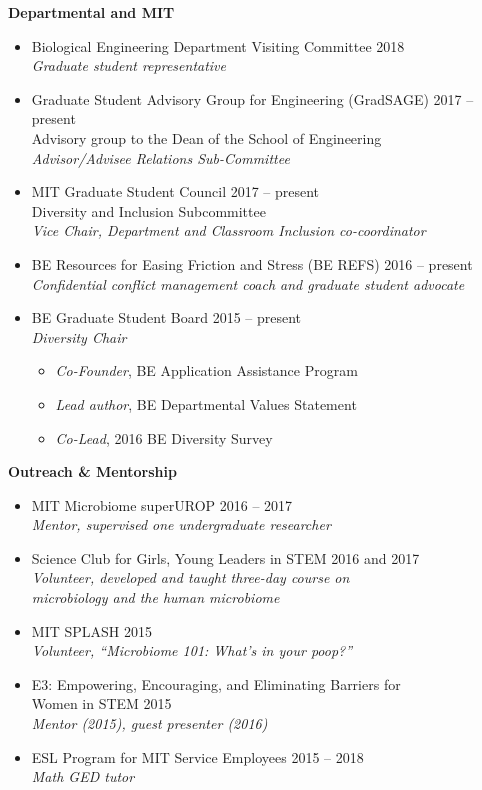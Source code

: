 \documentclass[10pt]{article}
\newenvironment{outerlist}[1][\enskip\textbullet]%
        {\begin{itemize}[#1,leftmargin=*]}{\end{itemize}%
         \vspace{-.6\baselineskip}}
\newenvironment{innerlist}[1][\enskip\textbullet]%
        {\begin{itemize}[#1,leftmargin=*,parsep=0pt,itemsep=0pt,topsep=0pt,partopsep=0pt]}
        {\end{itemize}}
\begin{document}
\textbf{Departmental and MIT}
\begin{outerlist}
	\item[] Biological Engineering Department Visiting Committee \hfill {2018} \\
	\textit{Graduate student representative}
	\item[] Graduate Student Advisory Group for Engineering (GradSAGE) \hfill {2017 -- present} \\
	Advisory group to the Dean of the School of Engineering \\
	\textit{Advisor/Advisee Relations Sub-Committee}
	\item[] MIT Graduate Student Council \hfill {2017 -- present} \\
		Diversity and Inclusion Subcommittee  \\
		\textit{Vice Chair, Department and Classroom Inclusion co-coordinator} 
	\item[] BE Resources for Easing Friction and Stress (BE REFS) \hfill {2016 -- present} \\
	\textit{Confidential conflict management coach and graduate student advocate}
	\item[] BE Graduate Student Board \hfill {2015 -- present} \\ 
		\textit{Diversity Chair} 
		\begin{innerlist}
			\item[] \textit{Co-Founder}, BE Application Assistance Program 
			\item[] \textit{Lead author}, BE Departmental Values Statement 
			\item[] \textit{Co-Lead}, 2016 BE Diversity Survey
		\end{innerlist}
\end{outerlist}
\vspace{.15in}

\textbf{Outreach \& Mentorship}
\begin{outerlist}
	\item[] MIT Microbiome superUROP \hfill {2016 -- 2017} \\
	\textit{Mentor, supervised one undergraduate researcher}
	\item[] Science Club for Girls, Young Leaders in STEM \hfill {2016 and 2017} \\ \textit{Volunteer, developed and taught three-day course on} \\ \textit{microbiology and the human microbiome} 
	\item[] MIT SPLASH \hfill 2015 \\
	\textit{Volunteer, ``Microbiome 101: What's in your poop?''}
	\item[] E3: Empowering, Encouraging, and Eliminating Barriers for \\ Women in STEM \hfill 2015 \\
	\textit{Mentor (2015), guest presenter (2016)}
	\item[] ESL Program for MIT Service Employees \hfill {2015 -- 2018} \\
	\textit{Math GED tutor}
\end{outerlist}
\vspace{.15in}
\end{document}
